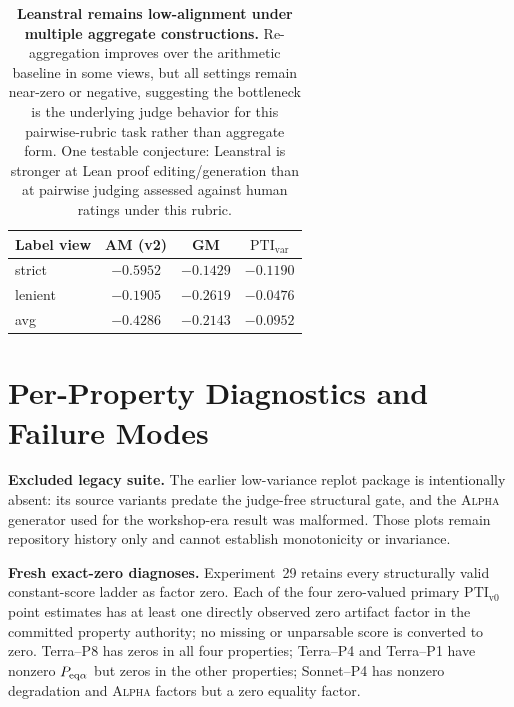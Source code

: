 \documentclass{article}
\newcommand{\PTI}{\mathrm{PTI}}                  %
\newcommand{\PTIvzero}{\PTI_{\mathrm{v0}}}        %
\newcommand{\PTIvar}{\PTI_{\mathrm{var}}}        %
\begin{document}
\begin{table}[h]
  \centering
  \small
  \begin{tabular}{lccc}
    \toprule
    \textbf{Label view} & \textbf{AM (v2)} & \textbf{GM} & $\PTIvar$ \\
    \midrule
    strict  & $-0.5952$ & $-0.1429$ & $-0.1190$ \\
    lenient & $-0.1905$ & $-0.2619$ & $-0.0476$ \\
    avg     & $-0.4286$ & $-0.2143$ & $-0.0952$ \\
    \bottomrule
  \end{tabular}
  \caption{\textbf{Leanstral remains low-alignment under multiple aggregate constructions.}
    Re-aggregation improves over the arithmetic baseline in some views, but all settings remain near-zero or negative, suggesting the bottleneck is the underlying judge behavior for this pairwise-rubric task rather than aggregate form.
    One testable conjecture: Leanstral is stronger at Lean proof editing/generation than at pairwise judging assessed against human ratings under this rubric.}
  \label{tab:app-leanstral-index-reagg}
\end{table}

\section{Per-Property Diagnostics and Failure Modes}\label{app:failure}

\textbf{Excluded legacy suite.}
The earlier low-variance replot package is intentionally absent: its source variants predate the judge-free structural gate, and the \textsc{Alpha} generator used for the workshop-era result was malformed. Those plots remain repository history only and cannot establish monotonicity or invariance.

\textbf{Fresh exact-zero diagnoses.}
Experiment~29 retains every structurally valid constant-score ladder as factor zero. Each of the four zero-valued primary $\PTIvzero$ point estimates has at least one directly observed zero artifact factor in the committed property authority; no missing or unparsable score is converted to zero. Terra--P8 has zeros in all four properties; Terra--P4 and Terra--P1 have nonzero $P_{\rm eq\alpha}$ but zeros in the other properties; Sonnet--P4 has nonzero degradation and \textsc{Alpha} factors but a zero equality factor.
\end{document}
